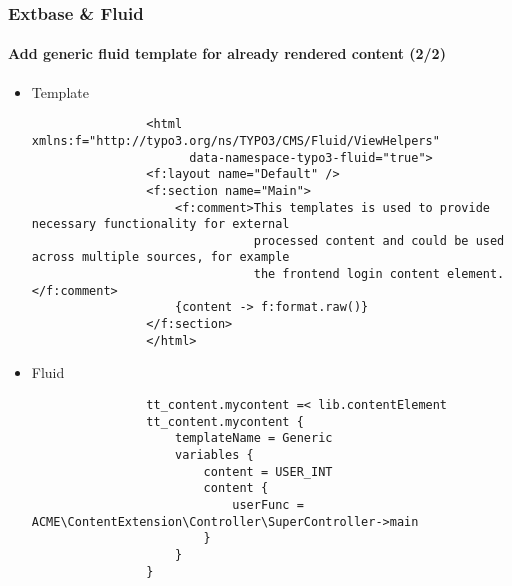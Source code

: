 
\begin{frame}[fragile]
	\frametitle{Extbase \& Fluid}
	\framesubtitle{Add generic fluid template for already rendered content (2/2)}

	\lstset{basicstyle=\tiny\ttfamily}

	\begin{itemize}
		\item Template
			\vspace{-0.1cm}
			\begin{lstlisting}
				<html xmlns:f="http://typo3.org/ns/TYPO3/CMS/Fluid/ViewHelpers"
				      data-namespace-typo3-fluid="true">
				<f:layout name="Default" />
				<f:section name="Main">
				    <f:comment>This templates is used to provide necessary functionality for external
				               processed content and could be used across multiple sources, for example
				               the frontend login content element.</f:comment>
				    {content -> f:format.raw()}
				</f:section>
				</html>
			\end{lstlisting}

		\item Fluid
			\vspace{-0.1cm}
			\begin{lstlisting}
				tt_content.mycontent =< lib.contentElement
				tt_content.mycontent {
				    templateName = Generic
				    variables {
				        content = USER_INT
				        content {
				            userFunc = ACME\ContentExtension\Controller\SuperController->main
				        }
				    }
				}
			\end{lstlisting}

	\end{itemize}

\end{frame}


